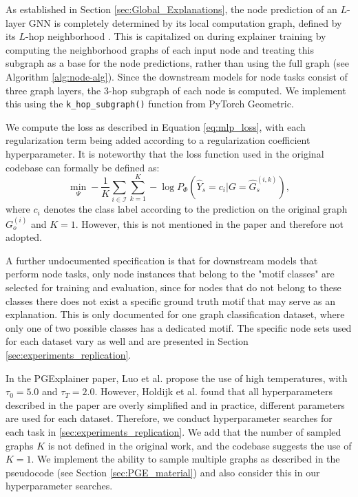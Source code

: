As established in Section \ref{sec:Global_Explanations}, the node prediction of an $L$-layer GNN is completely determined by its local computation graph, defined by its $L$-hop neighborhood \cite{ying2019gnnexplainer}. This is capitalized on during explainer training by computing the neighborhood graphs of each input node and treating this subgraph as a base for the node predictions, rather than using the full graph (see Algorithm \ref{alg:node-alg}). Since the downstream models for node tasks consist of three graph layers, the $3$-hop subgraph of each node is computed. We implement this using the \verb|k_hop_subgraph()| function from PyTorch Geometric. \bigskip

We compute the loss as described in Equation \ref{eq:mlp_loss}, with each regularization term being added according to a regularization coefficient hyperparameter. It is noteworthy that the loss function used in the original codebase can formally be defined as:
\begin{equation}
    \min_\Psi -\frac{1}{K}\sum_{i\in \mathcal{I}}\sum_{k=1}^K -\log P_\Phi(\hat{Y}_s = c_i|G=\hat{G}_s^{(i,k)}),
\end{equation}
where $c_i$ denotes the class label according to the prediction on the original graph $G_o^{(i)}$ and $K=1$. However, this is not mentioned in the paper and therefore not adopted. 

A further undocumented specification is that for downstream models that perform node tasks, only node instances that belong to the "motif classes" are selected for training and evaluation, since for nodes that do not belong to these classes there does not exist a specific ground truth motif that may serve as an explanation. This is only documented for one graph classification dataset, where only one of two possible classes has a dedicated motif. The specific node sets used for each dataset vary as well and are presented in Section \ref{sec:experiments_replication}.\bigskip

In the PGExplainer paper, Luo et al. \cite{luo2020parameterized} propose the use of high temperatures, with $\tau_0 = 5.0$ and $\tau_T=2.0$. However, Holdijk et al. \cite{holdijk2021re} found that all hyperparameters described in the paper are overly simplified and in practice, different parameters are used for each dataset. Therefore, we conduct hyperparameter searches for each task in \ref{sec:experiments_replication}. We add that the number of sampled graphs $K$ is not defined in the original work, and the codebase suggests the use of $K=1$. We implement the ability to sample multiple graphs as described in the pseudocode (see Section \ref{sec:PGE_material}) and also consider this in our hyperparameter searches. \bigskip

